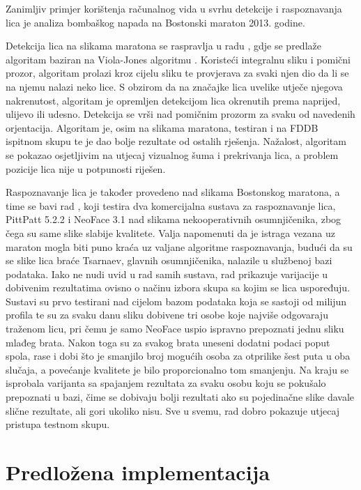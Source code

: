 \documentclass[times, utf8, seminar, numeric]{fer}
\begin{document}
Zanimljiv primjer korištenja računalnog vida u svrhu detekcije i raspoznavanja lica je analiza bombaškog napada na Bostonski maraton 2013. godine.

Detekcija lica na slikama maratona se raspravlja u radu \cite{barr2014effectiveness}, gdje se predlaže algoritam baziran na Viola-Jones algoritmu \cite{Viola01rapidobject}. Koristeći integralnu sliku i pomični prozor, algoritam prolazi kroz cijelu sliku te provjerava za svaki njen dio da li se na njemu nalazi neko lice. S obzirom da na značajke lica uvelike utječe njegova nakrenutost, algoritam je opremljen detekcijom lica okrenutih prema naprijed, ulijevo ili udesno. Detekcija se vrši nad pomičnim prozorm za svaku od navedenih orjentacija. Algoritam je, osim na slikama maratona,  testiran i na FDDB ispitnom skupu te je dao bolje rezultate od ostalih rješenja. Nažalost, algoritam se pokazao osjetljivim na utjecaj vizualnog šuma i prekrivanja lica, a problem pozicije lica nije u potpunosti riješen.

Raspoznavanje lica je također provedeno nad slikama Bostonskog maratona, a time se bavi rad \cite{Klontz13acase}, koji testira dva komercijalna sustava za raspoznavanje lica, PittPatt 5.2.2 i NeoFace 3.1 nad slikama nekooperativnih osumnjičenika, zbog čega su same slike slabije kvalitete. Valja napomenuti da je istraga vezana uz maraton mogla biti puno kraća uz valjane algoritme raspoznavanja, budući da su se slike lica braće Tsarnaev, glavnih osumnjičenika, nalazile u službenoj bazi podataka. Iako ne nudi uvid u rad samih sustava, rad prikazuje varijacije u dobivenim rezultatima ovisno o načinu izbora skupa sa kojim se lica uspoređuju. Sustavi su prvo testirani nad cijelom bazom podataka koja se sastoji od milijun profila te su za svaku danu sliku dobivene tri osobe koje najviše odgovaraju traženom licu, pri čemu je samo NeoFace uspio ispravno prepoznati jednu sliku mlađeg brata. Nakon toga su za svakog brata uneseni dodatni podaci poput spola, rase i dobi što je smanjilo broj mogućih osoba za otprilike šest puta u oba slučaja, a povećanje kvalitete je bilo proporcionalno tom smanjenju. Na kraju se isprobala varijanta sa spajanjem rezultata za svaku osobu koju se pokušalo prepoznati u bazi, čime se dobivaju bolji rezultati ako su pojedinačne slike davale slične rezultate, ali gori ukoliko nisu. Sve u svemu, rad dobro pokazuje utjecaj pristupa testnom skupu. 

\chapter{Predložena implementacija}
\label{sec:predlozeno}
\end{document}
